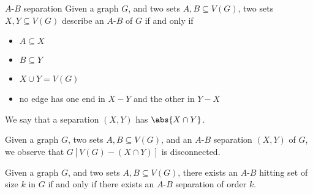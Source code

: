 \documentclass[a4paper, 12pt]{report}
\begin{document}
    \begin{frameddefn}{$A$-$B$ separation}
        Given a graph $G$, and two sets $A, B \subseteq V(G)$, two sets $X, Y \subseteq V(G)$ describe an $A$-$B$  of $G$ if and only if

        \begin{itemize}
            \item $A \subseteq X$
            \item $B \subseteq Y$
            \item $X \cup Y = V(G)$
            \item no edge has one end in $X - Y$ and the other in $Y - X$
        \end{itemize}
 
        We say that a separation $(X, Y)$ has  $\abs{X \cap Y}$.
    \end{frameddefn}

    Given a graph $G$, two sets $A, B \subseteq V(G)$, and an $A$-$B$ separation $(X, Y)$ of $G$, we observe that $G[V(G)-(X \cap Y)]$ is disconnected.

    \begin{framedprop}[label={menger prop}]{}
        Given a graph $G$, and two sets $A, B \subseteq V(G)$, there exists an $A$-$B$ hitting set of size $k$ in $G$ if and only if there exists an $A$-$B$ separation of order $k$.
    \end{framedprop}
\end{document}
